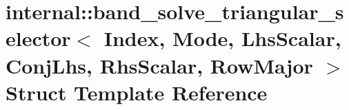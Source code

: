 \hypertarget{structinternal_1_1band__solve__triangular__selector_3_01_index_00_01_mode_00_01_lhs_scalar_00_0193d039d924d700ecb916fd425a10f1bb}{}\section{internal\+:\+:band\+\_\+solve\+\_\+triangular\+\_\+selector$<$ Index, Mode, Lhs\+Scalar, Conj\+Lhs, Rhs\+Scalar, Row\+Major $>$ Struct Template Reference}
\label{structinternal_1_1band__solve__triangular__selector_3_01_index_00_01_mode_00_01_lhs_scalar_00_0193d039d924d700ecb916fd425a10f1bb}
